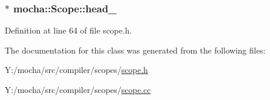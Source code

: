 \hypertarget{classmocha_1_1_scope_a3be4316686df6873241258805b9f7f54}{
\subsubsection[{head\_\-}]{$\ast$ {\bf mocha::Scope::head\_\-}}}
\label{classmocha_1_1_scope_a3be4316686df6873241258805b9f7f54}


Definition at line 64 of file scope.h.



The documentation for this class was generated from the following files:\begin{DoxyCompactItemize}
\item 
Y:/mocha/src/compiler/scopes/\hyperlink{scope_8h}{scope.h}\item 
Y:/mocha/src/compiler/scopes/\hyperlink{scope_8cc}{scope.cc}\end{DoxyCompactItemize}
